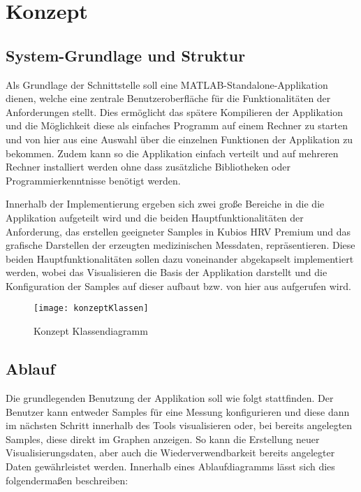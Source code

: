 
\chapter{Konzept}

\section{System-Grundlage und Struktur}
Als Grundlage der Schnittstelle soll eine MATLAB-Standalone-Applikation dienen, welche eine zentrale Benutzeroberfläche für die Funktionalitäten der Anforderungen stellt. Dies ermöglicht das spätere Kompilieren der Applikation und die Möglichkeit diese als einfaches Programm auf einem Rechner zu starten und von hier aus eine Auswahl über die einzelnen Funktionen der Applikation zu bekommen. Zudem kann so die Applikation einfach verteilt und auf mehreren Rechner installiert werden ohne dass zusätzliche Bibliotheken oder Programmierkenntnisse benötigt werden.

Innerhalb der Implementierung ergeben sich zwei große Bereiche in die die Applikation aufgeteilt wird und die beiden Hauptfunktionalitäten der Anforderung, das erstellen geeigneter Samples in Kubios HRV Premium und das grafische Darstellen der erzeugten medizinischen Messdaten, repräsentieren. Diese beiden Hauptfunktionalitäten sollen dazu voneinander abgekapselt implementiert werden, wobei das Visualisieren die Basis der Applikation darstellt und die Konfiguration der Samples auf dieser aufbaut bzw. von hier aus aufgerufen wird.

\begin{figure}[H]
	\centering
	\texttt{[image: konzeptKlassen]}
	\caption{Konzept Klassendiagramm}
	\label{fig:konzeptKlassen}
\end{figure}

\section{Ablauf}
Die grundlegenden Benutzung der Applikation soll wie folgt stattfinden. Der Benutzer kann entweder Samples für eine Messung konfigurieren und diese dann im nächsten Schritt innerhalb des Tools visualisieren oder, bei bereits angelegten Samples, diese direkt im Graphen anzeigen. So kann die Erstellung neuer Visualisierungsdaten, aber auch die Wiederverwendbarkeit bereits angelegter Daten gewährleistet werden. Innerhalb eines Ablaufdiagramms lässt sich dies folgendermaßen beschreiben:

